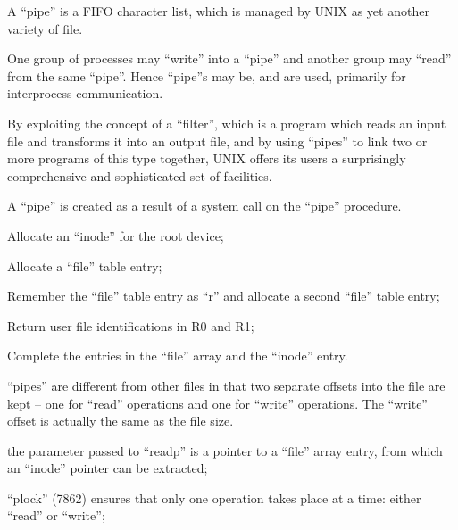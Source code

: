 %
%

A ``pipe''  is  a  FIFO  character  list,
which is managed by UNIX as yet another
variety of file.


One group of processes may ``write'' into
a  ``pipe''  and another group may ``read''
from the same ``pipe''. Hence ``pipe''s may
be,  and are used, primarily for interprocess communication.

By  exploiting   the   concept   of   a
``filter'',  which  is  a  program  which
reads an input file and  transforms  it
into  an  output  file,  and  by  using
``pipes'' to link two or more programs of
this  type  together,  UNIX  offers its
users a surprisingly comprehensive  and
sophisticated set of facilities.



A ``pipe'' is created as a result of a 
system call on the ``pipe'' procedure.

\bd
\item[7728:] Allocate an ``inode'' for the  root device;

\item[7731:] Allocate a ``file'' table entry;

\item[7736:] Remember the ``file''  table  entry
as  ``r''  and  allocate  a  second
``file'' table entry;

\item[7744:] Return user file  identifications
      in R0 and R1;

\item[7746:] Complete  the  entries   in   the
      ``file''   array  and  the  ``inode''
      entry.
\ed



``pipes'' are different from other  files
in  that  two separate offsets into the
file are kept -- one for  ``read''  operations 
and  one for ``write'' operations.
The ``write'' offset is actually the same
as the file size.

\bd
\item[7763:] the parameter passed  to  ``readp''
      is  a  pointer  to a ``file'' array
      entry,  from  which  an   ``inode''
      pointer can be extracted;

\item[7768:] ``plock'' (7862) ensures that  only
      one  operation  takes  place at a
      time: either ``read'' or ``write'';

